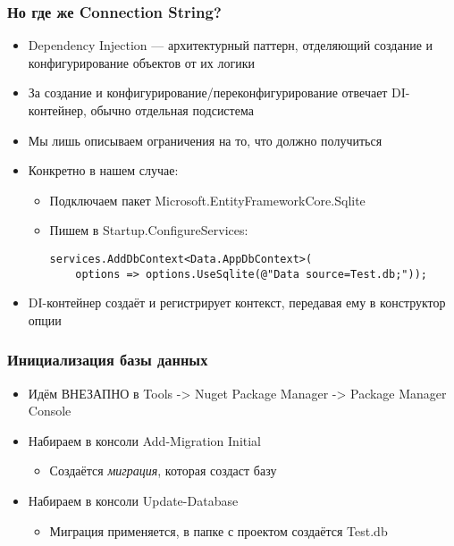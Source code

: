 \documentclass[xetex,mathserif,serif]{beamer}
\begin{document}
	\begin{frame}[fragile]
		\frametitle{Но где же Connection String?}
		\begin{itemize}
			\item Dependency Injection --- архитектурный паттерн, отделяющий создание и конфигурирование объектов от их логики
			\item За создание и конфигурирование/переконфигурирование отвечает DI-контейнер, обычно отдельная подсистема
			\item Мы лишь описываем ограничения на то, что должно получиться
			\item Конкретно в нашем случае:
			\begin{itemize} 
				\item Подключаем пакет Microsoft.EntityFrameworkCore.Sqlite
				\item Пишем в Startup.ConfigureServices:
				\begin{verbatim}
services.AddDbContext<Data.AppDbContext>(
    options => options.UseSqlite(@"Data source=Test.db;"));
				\end{verbatim}
			\end{itemize}
			\item DI-контейнер создаёт и регистрирует контекст, передавая ему в конструктор опции
		\end{itemize}
	\end{frame}

	\begin{frame}
		\frametitle{Инициализация базы данных}
		\begin{itemize}
			\item Идём ВНЕЗАПНО в Tools -> Nuget Package Manager -> Package Manager Console
			\item Набираем в консоли Add-Migration Initial
			\begin{itemize}
				\item Создаётся \textit{миграция}, которая создаст базу
			\end{itemize}
			\item Набираем в консоли Update-Database
			\begin{itemize}
				\item Миграция применяется, в папке с проектом создаётся Test.db
			\end{itemize}
		\end{itemize}
	\end{frame}
\end{document}
